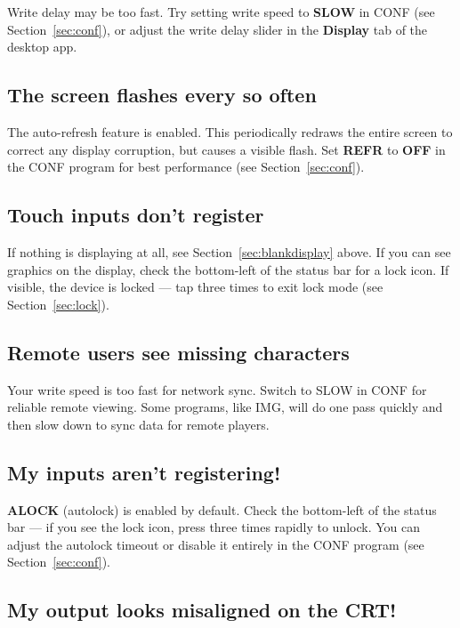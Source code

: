 \documentclass[10pt]{article}
\newcommand{\key}[1]{\fbox{\texttt{\footnotesize #1}}}
\begin{document}
Write delay may be too fast. Try setting write speed to \textbf{SLOW} in CONF (see Section~\ref{sec:conf}), or adjust the write delay slider in the \textbf{Display} tab of the desktop app.

\subsection{The screen flashes every so often}

The auto-refresh feature is enabled. This periodically redraws the entire screen to correct any display corruption, but causes a visible flash. Set \textbf{REFR} to \textbf{OFF} in the CONF program for best performance (see Section~\ref{sec:conf}).

\subsection{Touch inputs don't register}

If nothing is displaying at all, see Section~\ref{sec:blankdisplay} above. If you can see graphics on the display, check the bottom-left of the status bar for a lock icon. If visible, the device is locked --- tap \key{SEL} three times to exit lock mode (see Section~\ref{sec:lock}).

\subsection{Remote users see missing characters}

Your write speed is too fast for network sync. Switch to SLOW in CONF for reliable remote viewing. Some programs, like IMG, will do one pass quickly and then slow down to sync data for remote players.

\subsection{My inputs aren't registering!}

\textbf{ALOCK} (autolock) is enabled by default. Check the bottom-left of the status bar --- if you see the lock icon, press \key{SEL} three times rapidly to unlock. You can adjust the autolock timeout or disable it entirely in the CONF program (see Section~\ref{sec:conf}).

\subsection{My output looks misaligned on the CRT!}
\end{document}
